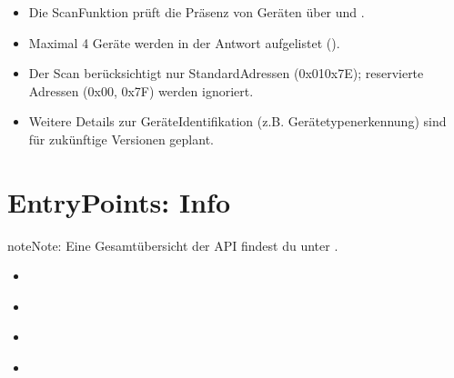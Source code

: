 \documentclass[letterpaper,10pt,english]{sphinxmanual}
\begin{document}
\sphinxAtStartPar
{}
\begin{itemize}
\item {} 
\sphinxAtStartPar
Die Scan\sphinxhyphen{}Funktion prüft die Präsenz von Geräten über  und .

\item {} 
\sphinxAtStartPar
Maximal 4 Geräte werden in der Antwort aufgelistet ().

\item {} 
\sphinxAtStartPar
Der Scan berücksichtigt nur Standard\sphinxhyphen{}Adressen (0x01\textendash{}0x7E); reservierte Adressen (0x00, 0x7F) werden ignoriert.

\item {} 
\sphinxAtStartPar
Weitere Details zur Geräte\sphinxhyphen{}Identifikation (z.B. Gerätetypenerkennung) sind für zukünftige Versionen geplant.

\end{itemize}

\sphinxstepscope


\chapter{Entry\sphinxhyphen{}Points: Info}
\label{\detokenize{agv_rest_api_info:entry-points-info}}\label{\detokenize{agv_rest_api_info::doc}}
\begin{sphinxadmonition}{note}{Note:}
\sphinxAtStartPar
Eine Gesamtübersicht der API findest du unter {\hyperref[\detokenize{index::doc}]{}}.
\end{sphinxadmonition}

\sphinxAtStartPar
{}
\begin{itemize}
\item {} 
\sphinxAtStartPar
{\hyperref[\detokenize{agv_rest_api_info:get-api-info-agv}]{}}

\item {} 
\sphinxAtStartPar
{\hyperref[\detokenize{agv_rest_api_info:get-api-info-esp32-chip}]{}}

\item {} 
\sphinxAtStartPar
{\hyperref[\detokenize{agv_rest_api_info:get-api-info-esp32-network}]{}}

\item {} 
\sphinxAtStartPar
{\hyperref[\detokenize{agv_rest_api_info:get-api-info-esp32-partitions}]{}}

\end{itemize}
\end{document}
